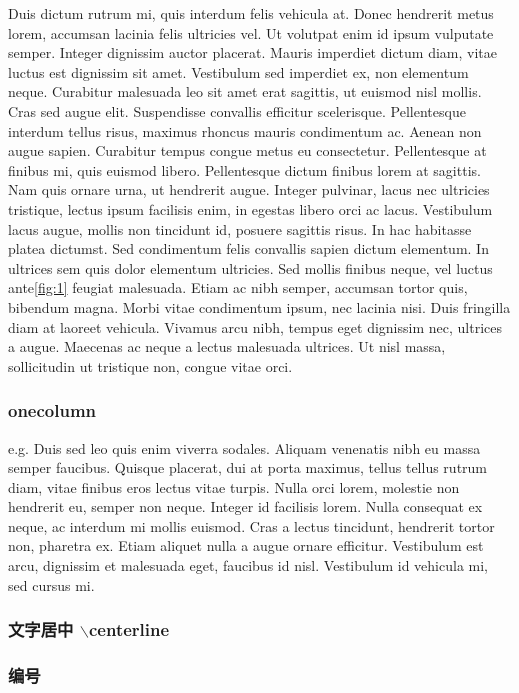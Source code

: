 \documentclass{article}[20pt]
\begin{document}
Duis dictum rutrum mi, quis interdum felis vehicula at. Donec hendrerit metus lorem, accumsan lacinia felis ultricies vel. Ut volutpat enim id ipsum vulputate semper. Integer dignissim auctor placerat. Mauris imperdiet dictum diam, vitae luctus est dignissim sit amet. Vestibulum sed imperdiet ex, non elementum neque. Curabitur malesuada leo sit amet erat sagittis, ut euismod nisl mollis. Cras sed augue elit. Suspendisse convallis efficitur scelerisque. Pellentesque interdum tellus risus, maximus rhoncus mauris condimentum ac. Aenean non augue sapien. Curabitur tempus congue metus eu consectetur. Pellentesque at finibus mi, quis euismod libero.
Pellentesque dictum finibus lorem at sagittis. Nam quis ornare urna, ut hendrerit augue. Integer pulvinar, lacus nec ultricies tristique, lectus ipsum facilisis enim, in egestas libero orci ac lacus. Vestibulum lacus augue, mollis non tincidunt id, posuere sagittis risus. In hac habitasse platea dictumst. Sed condimentum felis convallis sapien dictum elementum. In ultrices sem quis dolor elementum ultricies. Sed mollis finibus neque, vel luctus ante\ref{fig:1} feugiat malesuada. Etiam ac nibh semper, accumsan tortor quis, bibendum magna. Morbi vitae condimentum ipsum, nec lacinia nisi. Duis fringilla diam at laoreet vehicula. Vivamus arcu nibh, tempus eget dignissim nec, ultrices a augue. Maecenas ac neque a lectus malesuada ultrices. Ut nisl massa, sollicitudin ut tristique non, congue vitae orci.

\subsubsection{onecolumn}e.g.
\onecolumn
Duis sed leo quis enim viverra sodales. Aliquam venenatis nibh eu massa semper faucibus. Quisque placerat, dui at porta maximus, tellus tellus rutrum diam, vitae finibus eros lectus vitae turpis. Nulla orci lorem, molestie non hendrerit eu, semper non neque. Integer id facilisis lorem. Nulla consequat ex neque, ac interdum mi mollis euismod. Cras a lectus tincidunt, hendrerit tortor non, pharetra ex. Etiam aliquet nulla a augue ornare efficitur. Vestibulum est arcu, dignissim et malesuada eget, faucibus id nisl. Vestibulum id vehicula mi, sed cursus mi.
\subsubsection{文字居中 $\backslash$centerline}
\subsubsection{编号}
\end{document}
